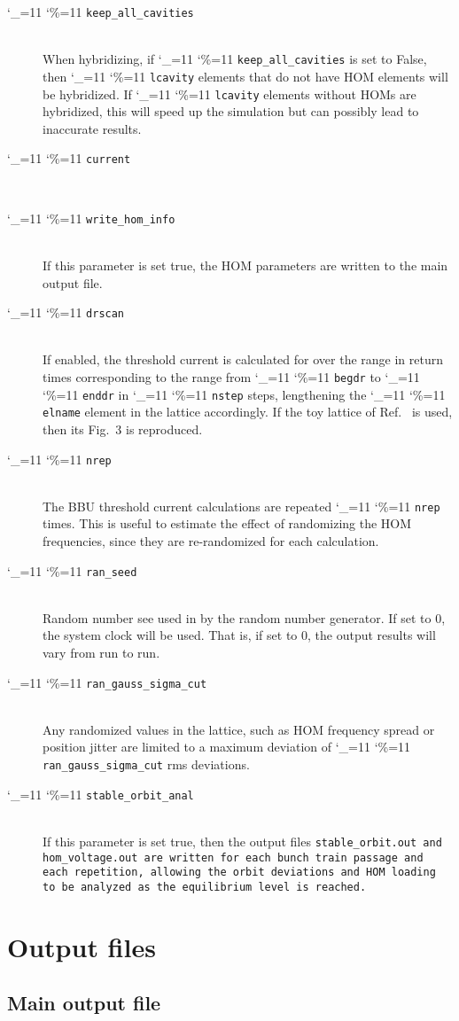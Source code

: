 \documentclass[11pt]{article}
\newcommand\ttcmd{\begingroup\catcode`\_=11 \catcode`\%=11 \dottcmd}
\newcommand\dottcmd[1]{\texttt{#1}\endgroup}
\newcommand{\vn}{\ttcmd}
\newcommand{\Newline}{\hfil \\}
\begin{document}
\begin{description}
  \item[\vn{keep_all_cavities}] \Newline
When hybridizing, if \vn{keep_all_cavities} is set to False, then
\vn{lcavity} elements that do not have HOM elements will be
hybridized. If \vn{lcavity} elements without HOMs are hybridized, this
will speed up the simulation but can possibly lead to inaccurate
results.
  \item[\vn{current}] \Newline
  \item[\vn{write_hom_info}] \Newline
If this parameter is set true, the HOM parameters are written to the
main output file.
  \item[\vn{drscan}] \Newline
If enabled, the threshold current is calculated for over the range in return times
corresponding to the range from \vn{begdr} to \vn{enddr} in  \vn{nstep} steps,
lengthening the \vn{elname} element in the lattice accordingly. If the toy lattice
of Ref.~\cite{ref:Hoffstaetter04} is used, then its Fig.~3 is reproduced.
  \item[\vn{nrep}] \Newline
The BBU threshold current calculations are repeated \vn{nrep} times. This is useful
to estimate the effect of randomizing the HOM frequencies, since they are re-randomized for
each calculation.
  \item[\vn{ran_seed}] \Newline
Random number see used in by the random number generator. If set to 0, the system clock
will be used. That is, if set to 0, the output results will vary from run to run. 
  \item[\vn{ran_gauss_sigma_cut}] \Newline
Any randomized values in the lattice, such as HOM frequency spread or position jitter
are limited to a maximum deviation of \vn{ran_gauss_sigma_cut} rms deviations. 
  \item[\vn{stable_orbit_anal}] \Newline
If this parameter is set true, then the output files \tt{stable_orbit.out} and \tt{hom_voltage.out}
are written for each bunch train passage and each repetition, allowing the orbit deviations
and HOM loading to be analyzed as the equilibrium level is reached.

\end{description}
\section{Output files} 

\subsection{Main output file}
\end{document}

